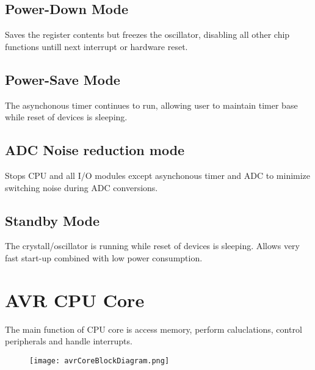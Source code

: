 \subsection{Power-Down Mode}
\quad Saves the register contents but freezes the oscillator, disabling all other chip functions untill next interrupt or hardware reset.

\subsection{Power-Save Mode}
\quad The asynchonous timer continues to run, allowing user to maintain timer base while reset of devices is sleeping.

\subsection{ADC Noise reduction mode}
\quad Stops CPU and all I/O modules except asynchonous timer and ADC to minimize switching noise during ADC conversions.

\subsection{Standby Mode}
\quad The crystall/oscillator is running while reset of devices is sleeping. Allows very fast start-up combined with low power consumption.


\section{AVR CPU Core}
\quad The main function of CPU core is access memory, perform caluclations, control peripherals and handle interrupts.

\begin{figure}[H]
    \centering
    \texttt{[image: avrCoreBlockDiagram.png]}
\end{figure}

